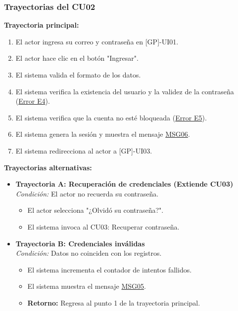 \begin{appendices}
\subsubsection{Trayectorias del CU02}
\textbf{Trayectoria principal:}
\begin{enumerate}[nosep]
    \item El actor ingresa su correo y contraseña en [GP]-UI01.
    \item El actor hace clic en el botón "Ingresar".
    \item El sistema valida el formato de los datos.
    \item El sistema verifica la existencia del usuario y la validez de la contraseña (\hyperlink{err:E4}{Error E4}).
    \item El sistema verifica que la cuenta no esté bloqueada (\hyperlink{err:E5}{Error E5}).
    \item El sistema genera la sesión y muestra el mensaje \hyperlink{msg:MSG06}{MSG06}.
    \item El sistema redirecciona al actor a [GP]-UI03.
\end{enumerate}

\textbf{Trayectorias alternativas:}
\begin{itemize}[leftmargin=*]
    \item \textbf{Trayectoria A: Recuperación de credenciales (Extiende CU03)} \\
    \textit{Condición:} El actor no recuerda su contraseña.
    \begin{itemize}[nosep]
        \item[A-1:] El actor selecciona "¿Olvidó su contraseña?".
        \item[A-2:] El sistema invoca al CU03: Recuperar contraseña.
    \end{itemize}
    \item \textbf{Trayectoria B: Credenciales inválidas} \\
    \textit{Condición:} Datos no coinciden con los registros.
    \begin{itemize}[nosep]
        \item[B-1:] El sistema incrementa el contador de intentos fallidos.
        \item[B-2:] El sistema muestra el mensaje \hyperlink{msg:MSG05}{MSG05}.
        \item \textbf{Retorno:} Regresa al punto 1 de la trayectoria principal.
    \end{itemize}
\end{itemize}


\end{appendices}

